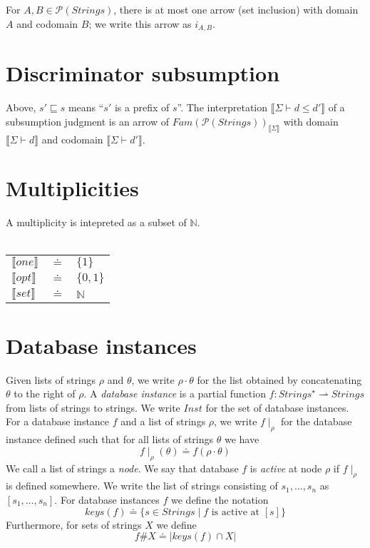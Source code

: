 \documentclass{article}
\newcommand{\sem}[1]{\llbracket #1 \rrbracket}
\begin{document}
For $A,B \in \mathcal P(\mathit{Strings})$, there is at most one arrow (set inclusion) with domain $A$ and 
codomain $B$; we write this arrow as $i_{A,B}$.


\section*{Discriminator subsumption}


Above, $s' \sqsubseteq s$ means ``$s'$ is a prefix of $s$''. 
The interpretation $\sem{\Sigma \vdash d \leq d'}$ of a subsumption judgment is an arrow of $\mathit{Fam}(\mathcal P(\mathit{Strings}))_{\sem{\Sigma}}$ with domain $\sem{\Sigma \vdash d}$ and codomain $\sem{\Sigma \vdash d'}$. 

\section*{Multiplicities}

A multiplicity is intepreted as a subset of $\mathbb N$.\\~\\
\begin{tabular}{lll}
$\sem{one}$ & $\doteq$ & $\{ 1 \}$ \\
$\sem{opt}$ & $\doteq$ & $\{ 0, 1 \}$ \\
$\sem{set}$ & $\doteq$ & $\mathbb N$
\end{tabular}
\section*{Database instances}

Given lists of strings $\rho$ and $\theta$, we write $\rho \cdot \theta$ for the list obtained by concatenating $\theta$ to the right of $\rho$. A \emph{database instance} is a partial function $f : \mathit{Strings}^{\star} \rightharpoonup \mathit{Strings}$ from lists of strings to strings. We write $\mathit{Inst}$ for the set of database instances. For a database instance $f$ and a list of strings $\rho$, we write $f \! \mid_\rho$ for the database instance defined such that for all lists of strings $\theta$ we have $$f \! \mid_\rho \! (\theta) \doteq f(\rho \cdot \theta)$$ We call a list of strings a \emph{node}. We say that database $f$ is \emph{active} at node $\rho$ if $f \! \mid_\rho$ is defined somewhere. We write the list of strings consisting of $s_1, \ldots, s_n$ as $[s_1,\ldots,s_n]$. For database instances $f$ we define the notation $$\mathit{keys}(f) \doteq \{ s \in \mathit{Strings} \mid f \text{ is active at } [s] \}$$ Furthermore, for sets of strings $X$ we define
$$f \# X \doteq | \mathit{keys}(f) \cap X |$$ 
\end{document}
